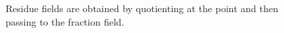 \begin{figure}[htbp]
\centering
{}
\caption{Residue fields are obtained by quotienting at the point and then passing to the fraction field.}
\end{figure}
